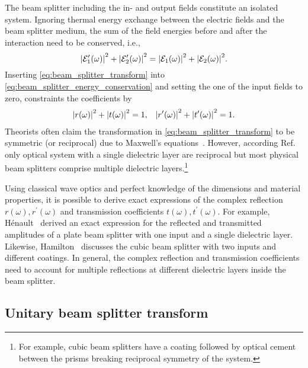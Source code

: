 The beam splitter including the in- and output fields constitute an isolated system.
Ignoring thermal energy exchange between the electric fields and the beam splitter medium, the sum of the field energies before and after the interaction need to be conserved, i.e.,
\begin{equation}
    \abs{\mathcal{E}_1^\prime(\omega)}^2
    +
    \abs{\mathcal{E}_2^\prime(\omega)}^2
    =
    \abs{\mathcal{E}_1(\omega)}^2
    +
    \abs{\mathcal{E}_2(\omega)}^2
    \label{eq:beam_splitter_energy_conservation}
    .
\end{equation}
Inserting \cref{eq:beam_splitter_transform} into \cref{eq:beam_splitter_energy_conservation} and setting the one of the input fields to zero, constraints the coefficients by
\begin{align}
    \abs{r(\omega)}^2+\abs{t(\omega)}^2
    =
    1,
    &&
    \abs{r^\prime(\omega)}^2+\abs{t^\prime(\omega)}^2
    =
    1
    \label{eq:beam_splitter_coefficients_constraint}
    .
\end{align}
Theorists often claim the transformation in \cref{eq:beam_splitter_transform} to be symmetric (or reciprocal) due to Maxwell's equations~\cite[p.~129]{Haroche2006}.
However, according Ref.~\cite{Potton2004} only optical system with a single dielectric layer are reciprocal but most physical beam splitters comprise multiple dielectric layers.\footnote{For example, cubic beam splitters have a coating followed by optical cement between the prisms breaking reciprocal symmetry of the system.}

Using classical wave optics and perfect knowledge of the dimensions and material properties, it is possible to derive exact expressions of the complex reflection $r(\omega),r^\prime(\omega)$ and transmission coefficients $t(\omega),t^\prime(\omega)$.
For example, Hénault~\cite{Henault2015} derived an exact expression for the reflected and transmitted amplitudes of a plate beam splitter with one input and a single dielectric layer.
Likewise, Hamilton~\cite{Hamilton2000} discusses the cubic beam splitter with two inputs and different coatings.
In general, the complex reflection and transmission coefficients need to account for multiple reflections at different dielectric layers inside the beam splitter.

\FloatBarrier
\subsection{Unitary beam splitter transform}

